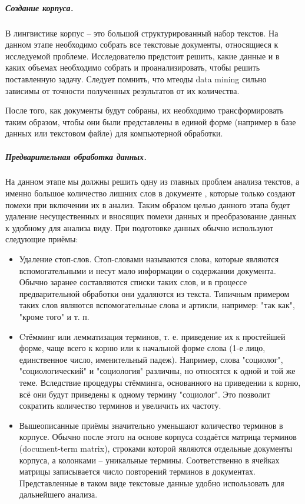 	\subparagraph{Создание корпуса.} В лингвистике корпус -- это большой структурированный набор текстов. На данном этапе необходимо собрать все текстовые документы, относящиеся к исследуемой проблеме. Исследователю предстоит решить, какие данные и в каких объемах необходимо собрать и проанализировать, чтобы решить поставленную задачу. Следует помнить, что мтеоды data mining сильно зависимы от точности полученных результатов от их количества.
	
	После того, как документы будут собраны, их необходимо трансформировать таким образом, чтобы они были представлены в единой форме (например в базе данных или текстовом файле) для компьютерной обработки.
	
	\subparagraph{Предварительная обработка данных.} На данном этапе мы должны решить одну из главных проблем анализа текстов, а именно большое количество лишних слов в документе \cite[стр. 213]{bargesyan2009}, которые только создают помехи при включении их в анализ. Таким образом целью данного этапа будет удаление несущественных и вносящих помехи данных и преобразование данных к удобному для анализа виду. При подготовке данных обычно используют следующие приёмы:
	
	\begin{itemize}
	
	\item Удаление стоп-слов. Стоп-словами называются слова, которые являются вспомогательными и несут мало информации о содержании документа. Обычно заранее составляются списки таких слов, и в процессе предварительной обработки они удаляются из текста. Типичным примером таких слов являются вспомогательные слова и артикли, например: "так как", "кроме того" и т. п.
	
	\item Cтёмминг или лемматизация терминов, т. е. приведение их к простейшей форме, чаще всего к корню или к начальной форме слова (1-е лицо, единственное число, именительный падеж). Например, слова "социолог", "социологический" и "социология" различны, но относятся к одной и той же теме. Вследствие процедуры стёмминга, основанного на приведении к корню, всё они будут приведены к одному термину "социолог". Это позволит сократить количество терминов и увеличить их частоту.
	
	\item Вышеописанные приёмы значительно уменьшают количество терминов в корпусе. Обычно после этого на основе корпуса создаётся матрица терминов (document-term matrix), строками которой являются отдельные документы корпуса, а колонками -- уникальные термины. Соответственно в ячейках матрицы записывается число повторений терминов в документах. Представленные в таком виде текстовые данные удобно использовать для дальнейшего анализа.

	\end{itemize}

